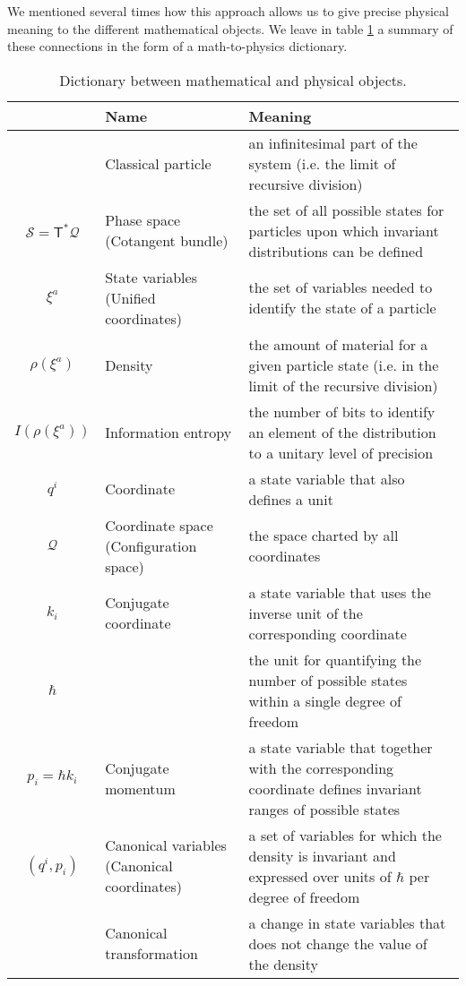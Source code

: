 \documentclass[11pt]{elsarticle}
\begin{document}
We mentioned several times how this approach allows us to give precise physical meaning to the different mathematical objects. We leave in table \ref{dictionary} a summary of these connections in the form of a math-to-physics dictionary.
\begin{table}[h!]
	\centering
	\begin{tabular}{c p{} p{} }
		& Name & Meaning\\ 
		\hline 
		& Classical particle & an infinitesimal part of the system (i.e. the limit of recursive division) \\ 
		$\mathcal{S} =\mathsf{T}^*\mathcal{Q}$ & Phase space \newline (Cotangent bundle) & the set of all possible states for particles upon which invariant distributions can be defined \\
		$\xi^a$ & State variables \newline (Unified coordinates) & the set of variables needed to identify the state of a particle \\ 
		$\rho(\xi^a)$ & Density & the amount of material for a given particle state (i.e. in the limit of the recursive division)\\ 
		$I(\rho(\xi^a))$ & Information entropy & the number of bits to identify an element of the distribution to a unitary level of precision\\ 
		$q^i$ & Coordinate & a state variable that also defines a unit \\
		$\mathcal{Q}$ & Coordinate space \newline (Configuration space) & the space charted by all coordinates \\
		$k_i$ & Conjugate coordinate & a state variable that uses the inverse unit of the corresponding coordinate \\
		$\hbar$ & & the unit for quantifying the number of possible states within a single degree of freedom \\
		$p_i=\hbar k_i$ & Conjugate momentum & a state variable that together with the corresponding coordinate defines invariant ranges of possible states \\
		$(q^i, p_i)$ & Canonical variables \newline (Canonical coordinates) & a set of variables for which the density is invariant and expressed over units of $\hbar$ per degree of freedom\\ 
		& Canonical transformation & a change in state variables that does not change the value of the density\\ 
	\end{tabular}
	\caption{Dictionary between mathematical and physical objects.}
	\label{dictionary}
\end{table}
\end{document}

